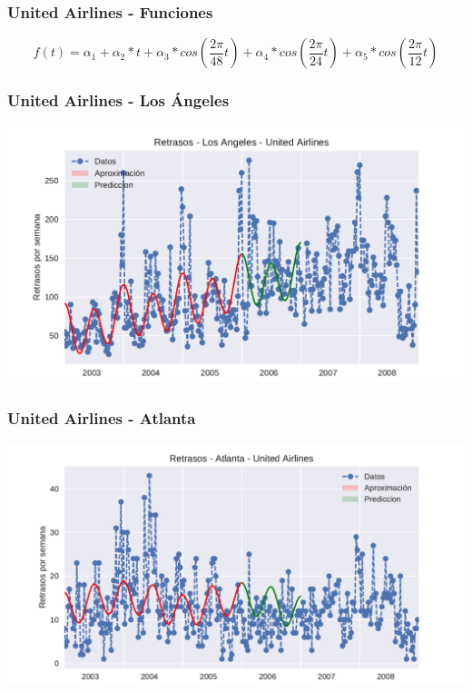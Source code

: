 \documentclass{beamer}
\begin{document}

\begin{frame}


\frametitle{United Airlines - Funciones}

$$ f(t) = \alpha_1 + \alpha_2 * t + \alpha_3 * cos(\frac{2\pi}{48} t) + \alpha_4 * cos(\frac{2\pi}{24} t) + \alpha_5 * cos(\frac{2\pi}{12} t) $$

\end{frame}



\begin{frame}



\frametitle{United Airlines - Los Ángeles}

{\centering
  \includegraphics[width=1.0\linewidth]{diapos/imagenes/retrasosUnitedAirlinesLAvol3.pdf}
}

\end{frame}


\begin{frame}


\frametitle{United Airlines - Atlanta}

{\centering
  \includegraphics[width=1.0\linewidth]{diapos/imagenes/retrasosUnitedAirlinesATLvol3.pdf}
}

\end{frame}
\end{document}
